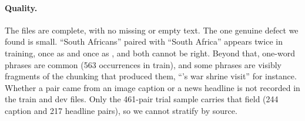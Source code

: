 \paragraph{Quality.}
The files are complete, with no missing or empty text. The one genuine defect we found is small. ``South Africans'' paired with ``South Africa'' appears twice in training, once as \FW{} and once as \NO{}, and both cannot be right. Beyond that, one-word phrases are common (563 occurrences in train), and some phrases are visibly fragments of the chunking that produced them, ``'s war shrine visit'' for instance. Whether a pair came from an image caption or a news headline is not recorded in the train and dev files. Only the 461-pair trial sample carries that field (244 caption and 217 headline pairs), so we cannot stratify by source.
